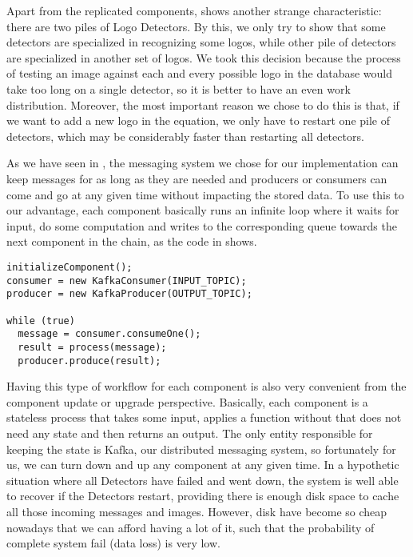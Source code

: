Apart from the replicated components, 
shows another strange characteristic: there are two piles of Logo Detectors.
By this, we only try to show that some detectors are specialized in recognizing
some logos, while other pile of detectors are specialized in another set of
logos. We took this decision because the process of testing an image against
each and every possible logo in the database would take too long on a single
detector, so it is better to have an even work distribution. Moreover, the most
important reason we chose to do this is that, if we want to add a new logo in
the equation, we only have to restart one pile of detectors, which may be
considerably faster than restarting all detectors.

As we have seen in , the messaging
system we chose for our implementation can keep messages for as long as they
are needed and producers or consumers can come and go at any given time
without impacting the stored data. To use this to our advantage, each
component basically runs an infinite loop where it waits for input, do some
computation and writes to the corresponding queue towards the next component
in the chain, as the code in  shows.

\lstset{caption=General Component Workflow,label=lst:comp-workflow}
\begin{lstlisting}
initializeComponent();
consumer = new KafkaConsumer(INPUT_TOPIC);
producer = new KafkaProducer(OUTPUT_TOPIC);

while (true)
  message = consumer.consumeOne();
  result = process(message);
  producer.produce(result);
\end{lstlisting}

Having this type of workflow for each component is also very convenient from
the component update or upgrade perspective. Basically, each component is a
stateless process that takes some input, applies a function without that does
not need any state and then returns an output. The only entity responsible for
keeping the state is Kafka, our distributed messaging system, so fortunately
for us, we can turn down and up any component at any given time. In a
hypothetic situation where all Detectors have failed and went down, the system
is well able to recover if the Detectors restart, providing there is enough disk space
to cache all those incoming messages and images. However, disk have become so
cheap nowadays that we can afford having a lot of it, such that the probability of
complete system fail (data loss) is very low.

